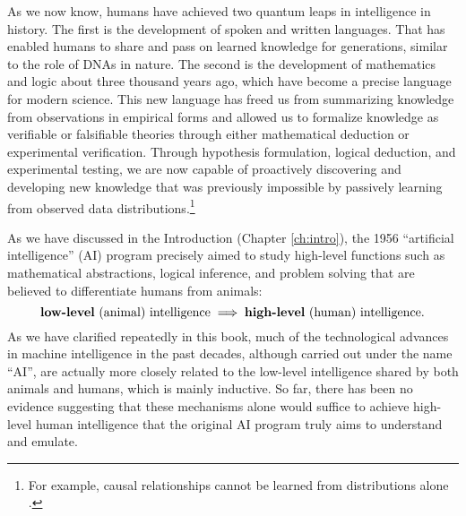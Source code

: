 \documentclass[../../book-main.tex]{subfiles}
\begin{document}
As we now know, humans have achieved two quantum leaps in intelligence in history.
The first is the development of spoken and written languages. That has enabled humans to share and pass on learned knowledge for generations, similar to the role of DNAs in nature. The second is the development of mathematics and logic about three thousand years ago, which have become a precise language for modern science. This new language has freed us from summarizing knowledge from observations in empirical forms and allowed us to formalize knowledge as verifiable or falsifiable theories through either mathematical deduction or experimental verification. Through hypothesis formulation, logical deduction, and experimental testing, we are now capable of proactively discovering and developing new knowledge that was previously impossible by passively learning from observed data distributions.\footnote{For example, causal relationships cannot be learned from distributions alone \cite{Pearl-2009}.}

As we have discussed in the Introduction (Chapter \ref{ch:intro}), the 1956 ``artificial intelligence'' (AI) program precisely aimed to study high-level functions such as mathematical abstractions, logical inference, and problem solving that are believed to differentiate humans from animals: 
\begin{equation}
   \mbox{\textbf{low-level} (animal) intelligence} \; \Longrightarrow \; 
   \mbox{\textbf{high-level} (human) intelligence.}
\end{equation}
As we have clarified repeatedly in this book, much of the technological advances in machine intelligence in the past decades, although carried out under the name ``AI'', are actually more closely related to the low-level intelligence shared by both animals and humans, which is mainly inductive. So far, there has been no evidence suggesting that these mechanisms alone would suffice to achieve high-level human intelligence that the original AI program truly aims to understand and emulate. 
\end{document}
